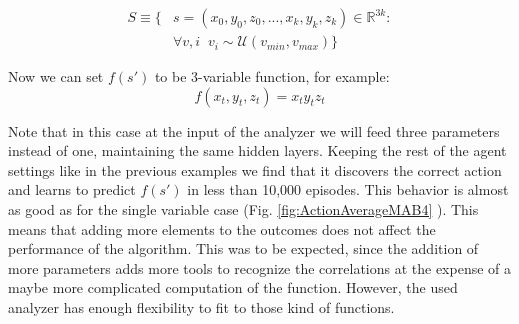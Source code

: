 \documentclass[11pt,a4paper,twoside]{report}
\newcommand{\+}{\textnormal{+} }
\theoremstyle{definition}
\numberwithin{equation}{chapter}
\begin{document}
    \begin{align}
      S\equiv\{&s=(x_0,y_0,z_0,...,x_k,y_k,z_k) \in \mathbb{R}^{3k}: \\
      & \forall v,i \; \; v_i \sim \mathcal{U}(v_{min},v_{max})
      \}
    \end{align}

    Now we can set $f(s')$ to be 3-variable function, for example:
    \begin{equation}
      f(x_t,y_t,z_t)=x_ty_tz_t
    \end{equation}

    Note that in this case at the input of the analyzer we will feed three
    parameters instead of one, maintaining the same hidden layers. Keeping the
    rest of the agent settings like in the previous examples we find that it
    discovers the correct action and learns to predict $f(s')$ in less than
    10,000 episodes. This behavior is almost as good as for the single variable
    case (Fig. \ref{fig:ActionAverageMAB4} ). This means that adding more
    elements to the outcomes does not affect the performance of the
    algorithm. This was to be expected, since the addition of more parameters
    adds more tools to recognize the correlations at the expense of a maybe more
    complicated computation of the function. However, the used analyzer has
    enough flexibility to fit to those kind of functions.
\end{document}
